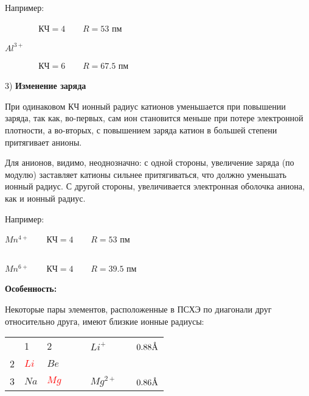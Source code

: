 Например:

\par\bigskip	

$\;\;\;\;\;\;\;\;\;\;\;\;\;$ КЧ$=4$ $\;\;\;\;\;$ $R=53$ пм

$Al^{3+}$

$\;\;\;\;\;\;\;\;\;\;\;\;\;$  КЧ$=6$ $\;\;\;\;\;$ $R=67.5$ пм

\par\bigskip

3) \textbf{Изменение заряда}

\par\smallskip

При одинаковом КЧ ионный радиус катионов уменьшается при
повышении заряда, так как, во-первых, сам ион становится
меньше при потере электронной плотности, а во-вторых, с
повышением заряда катион в большей степени притягивает
анионы.

\par\smallskip

Для анионов, видимо, неоднозначно: с одной стороны,
увеличение заряда (по модулю) заставляет катионы сильнее
притягиваться, что должно уменьшать ионный радиус. С другой
стороны, увеличивается электронная оболочка аниона, как и
ионный радиус.

Например:

\par\bigskip	

$Mn^{4+}$ $\;\;\;\;\;$ КЧ$=4$ $\;\;\;\;\;$ $R=53$ пм	

$\;\;\;\;\;$

$Mn^{6+}$ $\;\;\;\;\;$ КЧ$=4$ $\;\;\;\;\;$ $R=39.5$ пм	

\par\bigskip
	
\textbf{Особенность:}

\par\smallskip

Некоторые пары элементов, расположенные в ПСХЭ по диагонали
друг относительно друга, имеют близкие ионные радиусы:

\par\smallskip

\begin{center}
\begin{tabular}[c]{llllllll}
	& 1 & 2 &  &  & $Li^+$ &  & $0.88 \textup{\AA}$ \\
	2 & \textcolor{red}{$Li$} & $Be$ &  &  &   &  &   \\
	3 & $Na$ & \textcolor{red}{$Mg$} &  &  & $Mg^{2+}$ &  & $0.86 \textup{\AA}$ 
\end{tabular}
\end{center}

